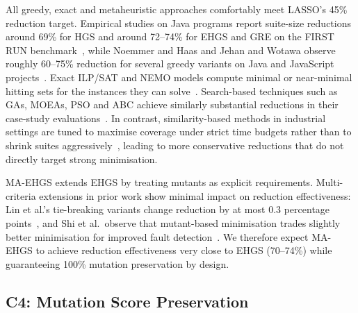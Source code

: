 \begin{appendices}
All greedy, exact and metaheuristic approaches comfortably meet LASSO's 45\% reduction target. Empirical studies on Java programs report suite-size reductions around 69\% for HGS and around 72--74\% for EHGS and GRE on the FIRST RUN benchmark~\cite{gladston2015}, while Noemmer and Haas and Jehan and Wotawa observe roughly 60--75\% reduction for several greedy variants on Java and JavaScript projects~\cite{noemmer2020,jehan2023}. Exact ILP/SAT and NEMO models compute minimal or near-minimal hitting sets for the instances they can solve~\cite{elbaum2002,lin2018}. Search-based techniques such as GAs, MOEAs, PSO and ABC achieve similarly substantial reductions in their case-study evaluations~\cite{yoo2012,wei2017,ahuja2024}. In contrast, similarity-based methods in industrial settings are tuned to maximise coverage under strict time budgets rather than to shrink suites aggressively~\cite{bach2017}, leading to more conservative reductions that do not directly target strong minimisation.

MA-EHGS extends EHGS by treating mutants as explicit requirements. Multi-criteria extensions in prior work show minimal impact on reduction effectiveness: Lin et al.'s tie-breaking variants change reduction by at most 0.3 percentage points~\cite{lin2018}, and Shi et al.\ observe that mutant-based minimisation trades slightly better minimisation for improved fault detection~\cite{shi2018}. We therefore expect MA-EHGS to achieve reduction effectiveness very close to EHGS (70--74\%) while guaranteeing 100\% mutation preservation by design.

\subsection{C4: Mutation Score Preservation}\label{app:c4}


\end{appendices}
